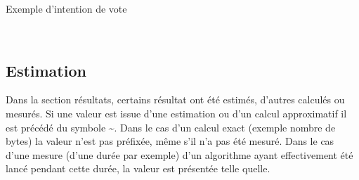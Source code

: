 \documentclass[../report]{subfiles}
\begin{document}
  \begin{table}[h]
  	\begin{center}
  		\caption{Exemple d'intention de vote}%
  		\label{fig:intro:notation:note-A}
  		\\[1em]
  	\end{center}
  \end{table}
  
  
  
  \subsection{Estimation}\label{sec:intro:notation:estimation}
  
  Dans la section résultats, certains résultat ont été estimés, d'autres calculés ou mesurés.
  Si une valeur est issue d'une estimation ou d'un calcul approximatif il est précédé du symbole \textasciitilde.
  Dans le cas d'un calcul exact (exemple nombre de bytes) la valeur n'est pas préfixée, même s'il n'a pas été mesuré.
  Dans le cas d'une mesure (d'une durée par exemple) d'un algorithme ayant effectivement été lancé pendant cette durée, la valeur est présentée telle quelle.
\end{document}
